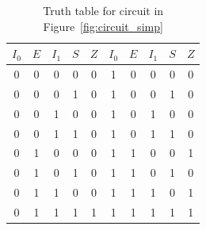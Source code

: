 \documentclass{article}
\begin{document}
\begin{table}[hbtp]
  \label{tab:truth_simp}
  \centering
  \begin{tabular}{cccc|c || cccc|c}
    $I_0$ & $E$ & $I_1$ & $S$ & $Z$ & $I_0$ & $E$ & $I_1$ & $S$ & $Z$ \\
    \hline
    0 & 0 & 0 & 0 & 0 & 1 & 0 & 0 & 0 & 0 \\
    0 & 0 & 0 & 1 & 0 & 1 & 0 & 0 & 1 & 0 \\
    0 & 0 & 1 & 0 & 0 & 1 & 0 & 1 & 0 & 0 \\
    0 & 0 & 1 & 1 & 0 & 1 & 0 & 1 & 1 & 0 \\
    0 & 1 & 0 & 0 & 0 & 1 & 1 & 0 & 0 & 1 \\
    0 & 1 & 0 & 1 & 0 & 1 & 1 & 0 & 1 & 0 \\
    0 & 1 & 1 & 0 & 0 & 1 & 1 & 1 & 0 & 1 \\
    0 & 1 & 1 & 1 & 1 & 1 & 1 & 1 & 1 & 1 \\
  \end{tabular}
  \caption{Truth table for circuit in Figure~\ref{fig:circuit_simp}}
\end{table}
\end{document}

